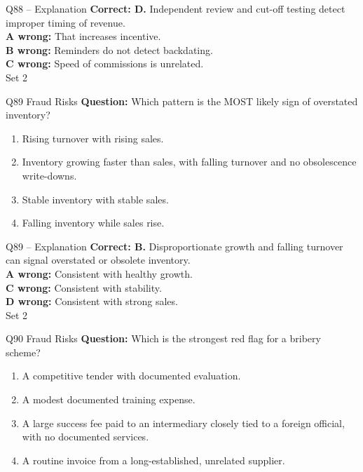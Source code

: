 \documentclass[aspectratio=169,10pt]{beamer}
\begin{document}
\begin{frame}[t]{Q88 -- Explanation}
	\footnotesize
	\textbf{Correct: D.} Independent review and cut-off testing detect improper timing of revenue. \\[5pt]
\textbf{A wrong:} That increases incentive. \\[3pt]
\textbf{B wrong:} Reminders do not detect backdating. \\[3pt]
\textbf{C wrong:} Speed of commissions is unrelated. \\[3pt]
	\vfill {\tiny Set 2}
\end{frame}

\begin{frame}[t]{Q89 \hfill {\scriptsize Fraud Risks}}
	\small
	\textbf{Question:} Which pattern is the MOST likely sign of overstated inventory?
	\begin{enumerate}[label=\Alph*.,itemsep=1pt,topsep=3pt]
			\item Rising turnover with rising sales.
			\item Inventory growing faster than sales, with falling turnover and no obsolescence write-downs.
			\item Stable inventory with stable sales.
			\item Falling inventory while sales rise.
	\end{enumerate}
\end{frame}

\begin{frame}[t]{Q89 -- Explanation}
	\footnotesize
	\textbf{Correct: B.} Disproportionate growth and falling turnover can signal overstated or obsolete inventory. \\[5pt]
\textbf{A wrong:} Consistent with healthy growth. \\[3pt]
\textbf{C wrong:} Consistent with stability. \\[3pt]
\textbf{D wrong:} Consistent with strong sales. \\[3pt]
	\vfill {\tiny Set 2}
\end{frame}

\begin{frame}[t]{Q90 \hfill {\scriptsize Fraud Risks}}
	\small
	\textbf{Question:} Which is the strongest red flag for a bribery scheme?
	\begin{enumerate}[label=\Alph*.,itemsep=1pt,topsep=3pt]
			\item A competitive tender with documented evaluation.
			\item A modest documented training expense.
			\item A large success fee paid to an intermediary closely tied to a foreign official, with no documented services.
			\item A routine invoice from a long-established, unrelated supplier.
	\end{enumerate}
\end{frame}
\end{document}

